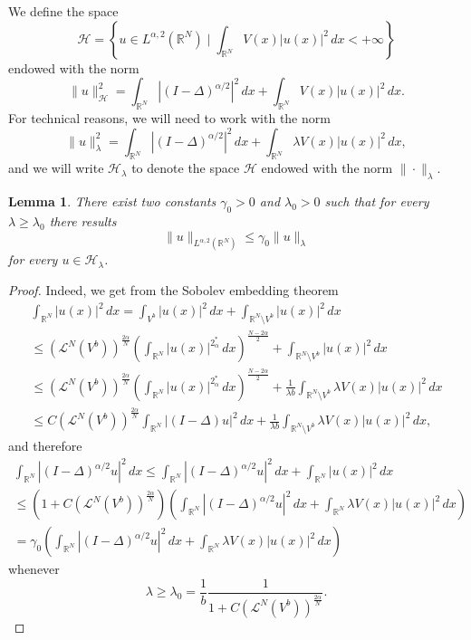 \documentclass[11pt]{amsart}
\numberwithin{equation}{section}
\newtheorem{lemma}[theorem]{Lemma}
\theoremstyle{remark}
\theoremstyle{definition}
\begin{document}
We define the space
\[
\mathscr{H} = \left\{ u \in L^{\alpha,2}(\mathbb{R}^N) \mid \int_{\mathbb{R}^N} V(x) |u(x)|^2 \, dx < +\infty\right\} 
\]
endowed with the norm
\[
\|u\|_{\mathscr{H}}^2 = \int_{\mathbb{R}^{N}} \left| (I-\Delta)^{\alpha/2} \right|^2 \, dx + \int_{\mathbb{R}^N} V(x) |u(x)|^2 \, dx.
\]
For technical reasons, we will need to work with the norm
\[
\|u\|_\lambda^2 = \int_{\mathbb{R}^{N}} \left| (I-\Delta)^{\alpha/2} \right|^2 \, dx + \int_{\mathbb{R}^N} \lambda V(x) |u(x)|^2 \, dx,
\]
and we will write $\mathscr{H}_\lambda$ to denote the space $\mathscr{H}$ endowed with the norm $\| \cdot \|_\lambda$.
\begin{lemma} \label{lem:3.2}
	There exist two constants $\gamma_0>0$ and $\lambda_0>0$ such that for every $\lambda \geqslant \lambda_0$ there results
	\[
		\|u\|_{L^{\alpha,2}(\mathbb{R}^N)} \leqslant \gamma_0 \|u\|_\lambda
	\]
	for every $u \in \mathscr{H}_\lambda$.
\end{lemma}
\begin{proof}
 Indeed, we get from the Sobolev embedding theorem
 \begin{multline*}
	 \int_{\mathbb{R}^N} |u(x)|^2 \, dx = \int_{V^b} 	 |u(x)|^2 \, dx + \int_{\mathbb{R}^N\setminus V^b}  |u(x)|^2 \, dx \\
	 \leqslant \left(\mathcal{L}^N \left( V^b \right)\right)^{\frac{2\alpha}{N}} \left( \int_{\mathbb{R}^N} |u(x)|^{2_\alpha^*} \, dx \right)^{\frac{N-2\alpha}{2}}
	 + \int_{\mathbb{R}^N\setminus V^b}  |u(x)|^2 \, dx \\
	 \leqslant \left(\mathcal{L}^N \left( V^b \right)\right)^{\frac{2\alpha}{N}} \left( \int_{\mathbb{R}^N} |u(x)|^{2_\alpha^*} \, dx \right)^{\frac{N-2\alpha}{2}} + \frac{1}{\lambda b}\int_{\mathbb{R}^N\setminus V^b}  \lambda V(x) |u(x)|^2 \, dx \\
	 \leqslant C \left(\mathcal{L}^N \left( V^b \right)\right)^{\frac{2\alpha}{N}}  \int_{\mathbb{R}^N} \left| (I-\Delta) u \right|^2 \, dx + \frac{1}{\lambda b}\int_{\mathbb{R}^N\setminus V^b}  \lambda V(x) |u(x)|^2 \, dx, 
	 \end{multline*}	
	 and therefore
 \begin{multline*}
 \int_{\mathbb{R}^N} \left| (I-\Delta)^{\alpha/2} u \right|^2 \, dx \leqslant \int_{\mathbb{R}^N} \left| (I-\Delta)^{\alpha/2} u \right|^2 \, dx + \int_{\mathbb{R}^N} |u(x)|^2 \, dx \\
  \leqslant \left(1+ C \left(\mathcal{L}^N \left( V^b \right)\right)^{\frac{2\alpha}{N}} \right) \left(   \int_{\mathbb{R}^N} \left| (I-\Delta)^{\alpha/2} u \right|^2 \, dx + \int_{\mathbb{R}^N}  \lambda V(x) |u(x)|^2 \, dx \right) \\
  = \gamma_0 \left(   \int_{\mathbb{R}^N} \left| (I-\Delta)^{\alpha/2} u \right|^2 \, dx + \int_{\mathbb{R}^N}  \lambda V(x) |u(x)|^2 \, dx \right)
 \end{multline*}
 whenever
 \[
 \lambda \geqslant \lambda_0 = \frac{1}{b} \frac{1}{1+ C \left(\mathcal{L}^N \left( V^b \right)\right)^{\frac{2\alpha}{N}}}.
 \]	 
\end{proof}
\end{document}
